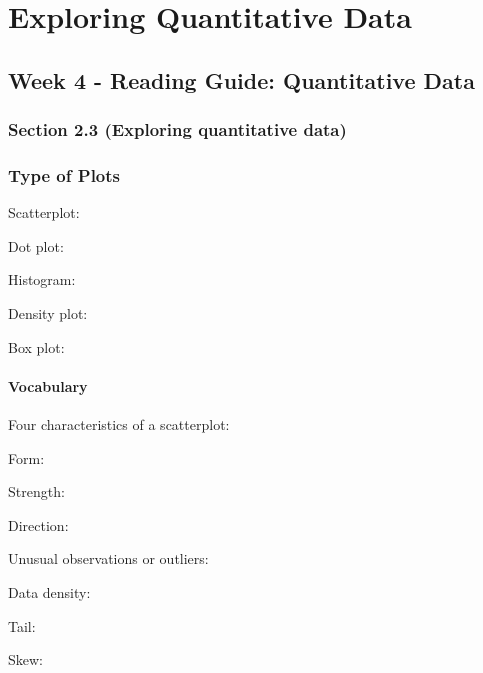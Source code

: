 \documentclass[
]{report}
\newcommand{\rgs}{\vspace{12pt}} %
\newcommand{\rgi}{\hspace{24pt}}  %
\begin{document}
\hypertarget{exploring-quantitative-data}{%
\chapter{Exploring Quantitative Data}\label{exploring-quantitative-data}}

\hypertarget{week-4---reading-guide-quantitative-data}{%
\section{Week 4 - Reading Guide: Quantitative Data}\label{week-4---reading-guide-quantitative-data}}


\hypertarget{section-2.3-exploring-quantitative-data}{%
\subsection*{Section 2.3 (Exploring quantitative data)}\label{section-2.3-exploring-quantitative-data}}

\hypertarget{type-of-plots}{%
\subsection*{Type of Plots}\label{type-of-plots}}

Scatterplot:
\rgs

Dot plot:
\rgs

Histogram:
\rgs

Density plot:
\rgs

Box plot:
\rgs

\hypertarget{vocabulary-5}{%
\subsubsection*{Vocabulary}\label{vocabulary-5}}

Four characteristics of a scatterplot:

\rgi Form:
\rgs

\rgi Strength:
\rgs

\rgi Direction:
\rgs

\rgi Unusual observations or outliers:
\rgs

Data density:
\rgs

Tail:
\rgs

Skew:
\rgs
\end{document}
